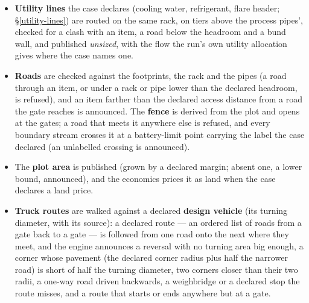 \documentclass[11pt,a4paper]{article}
\begin{document}
\begin{itemize}
  the shell \texttt{CONVERTER/shell}: Bed1Out, Bed2Feed, \ldots'') instead of
  leaving those streams out. A process pipe whose end is a unit the layout
  \emph{should} have placed --- one that is sized but has none of its items
  on the plot plan, or whose sizer refused --- is listed as not routed
  \emph{and} is a \textbf{finding}, \texttt{pipeNotRouted}, with the reason,
  so the plan can never read ``0 findings'' beside such a missing pipe. (Not
  findings, because they are rules and not failures: a stream of solids,
  a pipe with an end indoors, a stream with two consumers, a stream to a
  unit that has no sizer --- a dryer with none, a junction piped to no placed
  item --- which the layout has nothing to place for.)
\item
  \textbf{Utility lines} the case declares (cooling water, refrigerant,
  flare header; \S\ref{utility-lines}) are routed on the same rack, on
  tiers above the process pipes', checked for a clash with an item, a road
  below the headroom and a bund wall, and published \emph{unsized}, with
  the flow the run's own utility allocation gives where the case names
  one.
\item
  \textbf{Roads} are checked against the footprints, the rack and the
  pipes (a road through an item, or under a rack or pipe lower than the
  declared headroom, is refused), and an item farther than the declared
  access distance from a road the gate reaches is announced. The
  \textbf{fence} is derived from the plot and opens at the gates; a road
  that meets it anywhere else is refused, and every boundary stream
  crosses it at a battery-limit point carrying the label the case
  declared (an unlabelled crossing is announced).
\item
  The \textbf{plot area} is published (grown by a declared margin; absent
  one, a lower bound, announced), and the economics prices it as land
  when the case declares a land price.
\item
  \textbf{Truck routes} are walked against a declared \textbf{design
  vehicle} (its turning diameter, with its source): a declared route ---
  an ordered list of roads from a gate back to a gate --- is followed from
  one road onto the next where they meet, and the engine announces a
  reversal with no turning area big enough, a corner whose pavement
  (the declared corner radius plus half the narrower road) is short of
  half the turning diameter, two corners closer than their two radii, a
  one-way road driven backwards, a weighbridge or a declared stop the
  route misses, and a route that starts or ends anywhere but at a gate.

\end{itemize}
\end{document}
